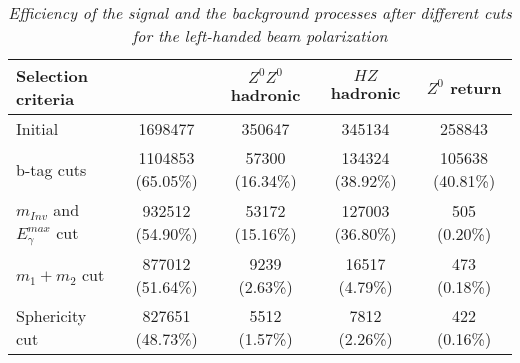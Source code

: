         \begin{table}[H]
        \begin{center}
        \begin{tabular}{l c c c c}
        \hline
	Selection criteria & \bbbar & $Z^0Z^0$ hadronic  & $HZ$ hadronic &  $Z^0$ return   \\
	\hline
	Initial & 1698477 & 350647 & 345134 & 258843 \\
	b-tag cuts & 1104853 (65.05\%) & 57300 (16.34\%) & 134324 (38.92\%) & 105638 (40.81\%) \\
	$m_{Inv}$ and $E_\gamma^{max}$ cut & 932512 (54.90\%) & 53172 (15.16\%) & 127003 (36.80\%) &  505 (0.20\%) \\
	$m_1+m_2$ cut & 877012 (51.64\%) & 9239 (2.63\%) & 16517 (4.79\%) & 473 (0.18\%) \\
	Sphericity cut & 827651 (48.73\%) & 5512 (1.57\%) & 7812 (2.26\%) & 422 (0.16\%) \\
        \hline
        \end{tabular}
        \end{center}
        \caption{\sl Efficiency of the signal and the background processes after different cuts for the left-handed beam polarization}
        \label{table:bbbarselection}
        \end{table}
